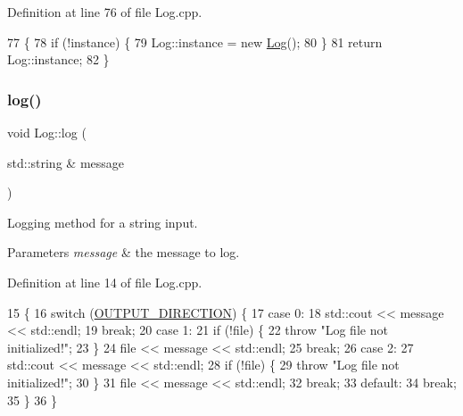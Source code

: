 Definition at line 76 of file Log.\+cpp.


\begin{DoxyCode}
77 \{
78   \textcolor{keywordflow}{if} (!instance) \{
79     Log::instance = \textcolor{keyword}{new} \mbox{\hyperlink{classLog}{Log}}();
80   \}
81   \textcolor{keywordflow}{return} Log::instance;
82 \}
\end{DoxyCode}
\mbox{\label{classLog_ac4365b77dc0b64c77e577888dfab5099}} 
\subsubsection{\texorpdfstring{log()}{log()}\hspace{0.1cm}{\footnotesize\ttfamily [1/2]}}
{\footnotesize\ttfamily void Log\+::log (\begin{DoxyParamCaption}\item[{std\+::string \&}]{message }\end{DoxyParamCaption})}

Logging method for a string input. 
\begin{DoxyParams}{Parameters}
{\em message} & the message to log. \\
\hline
\end{DoxyParams}


Definition at line 14 of file Log.\+cpp.


\begin{DoxyCode}
15 \{
16   \textcolor{keywordflow}{switch} (\mbox{\hyperlink{classLog_a8928d01e0edbf98838c642e04e12458e}{OUTPUT\_DIRECTION}}) \{
17   \textcolor{keywordflow}{case} 0:
18     std::cout << message << std::endl;
19     \textcolor{keywordflow}{break};
20   \textcolor{keywordflow}{case} 1:
21     \textcolor{keywordflow}{if} (!file) \{
22       \textcolor{keywordflow}{throw} \textcolor{stringliteral}{"Log file not initialized!"};
23     \}
24     file << message << std::endl;
25     \textcolor{keywordflow}{break};
26   \textcolor{keywordflow}{case} 2:
27     std::cout << message << std::endl;
28     \textcolor{keywordflow}{if} (!file) \{
29       \textcolor{keywordflow}{throw} \textcolor{stringliteral}{"Log file not initialized!"};
30     \}
31     file << message << std::endl;
32     \textcolor{keywordflow}{break};
33   \textcolor{keywordflow}{default}:
34     \textcolor{keywordflow}{break};
35   \}
36 \}
\end{DoxyCode}
\mbox{\label{classLog_a60929e600b7759e97ea623ea5b05971e}} 
